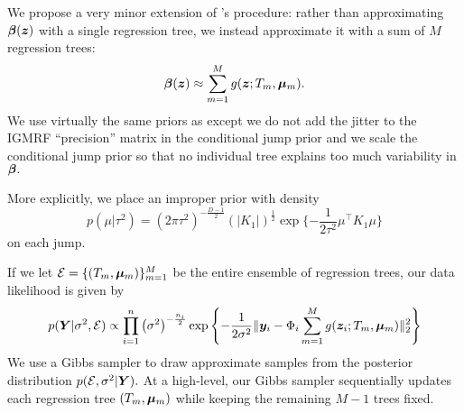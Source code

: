 We propose a very minor extension of \citet{Low-Kam2015}'s procedure: rather than approximating $\boldsymbol{\beta}(\bm{z})$ with a single regression tree, we instead approximate it with a sum of $M$ regression trees:
$$
\boldsymbol{\beta}(\bm{z}) \approx \sum_{m = 1}^{M}{g(\bm{z}; T_{m}, \boldsymbol{\mu}_{m})}.
$$
We use virtually the same priors as \citet{Low-Kam2015} except we do not add the jitter to the IGMRF ``precision'' matrix in the conditional jump prior and we scale the conditional jump prior so that no individual tree explains too much variability in $\boldsymbol{\beta}.$

More explicitly, we place an improper prior with density
$$
p(\mu \vert \tau^{2}) = \left(2\pi\tau^{2}\right)^{-\frac{D-1}{2}}\left(\lvert K_{1}\rvert\right)^{\frac{1}{2}}\exp\{-\frac{1}{2\tau^{2}}\mu^{\top}K_{1}\mu\}
$$ 
on each jump.

If we let $\mathcal{E} = \{(T_{m}, \boldsymbol{\mu}_{m})\}_{m = 1}^{M}$ be the entire ensemble of regression trees, our data likelihood is given by
\begin{equation}
\label{eq:likelihood}
p(\bm{Y} \vert \sigma^{2}, \mathcal{E}) \propto \prod_{i = 1}^{n}{\left(\sigma^{2}\right)^{-\frac{n_{i}}{2}}\exp\left\{-\frac{1}{2\sigma^{2}}\lVert \bm{y}_{i} - \Phi_{i}\sum_{m = 1}^{M}{g(\bm{z}_{i};T_{m}, \boldsymbol{\mu}_{m})}\rVert_{2}^{2}\right\}}
\end{equation}
We use a Gibbs sampler to draw approximate samples from the posterior distribution $p(\mathcal{E}, \sigma^{2} \vert \bm{Y}).$
At a high-level, our Gibbs sampler sequentially updates each regression tree $(T_{m}, \boldsymbol{\mu}_{m})$ while keeping the remaining $M-1$ trees fixed.


 





